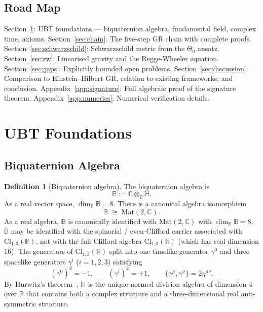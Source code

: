 \documentclass[12pt,a4paper]{article}
\theoremstyle{definition}
\newtheorem{definition}[theorem]{Definition}
\theoremstyle{remark}
\newcommand{\BB}{\mathbb{B}}
\newcommand{\CC}{\mathbb{C}}
\newcommand{\RR}{\mathbb{R}}
\newcommand{\HH}{\mathbb{H}}
\begin{document}
\subsection{Road Map}

Section~\ref{sec:foundations}: UBT foundations — biquaternion algebra,
fundamental field, complex time, axioms.
Section~\ref{sec:chain}: The five-step GR chain with complete proofs.
Section~\ref{sec:schwarzschild}: Schwarzschild metric from the $\Theta_0$ ansatz.
Section~\ref{sec:rw}: Linearised gravity and the Regge-Wheeler equation.
Section~\ref{sec:gaps}: Explicitly bounded open problems.
Section~\ref{sec:discussion}: Comparison to Einstein--Hilbert GR, relation
to existing frameworks, and conclusion.
Appendix~\ref{app:signature}: Full algebraic proof of the signature theorem.
Appendix~\ref{app:numerics}: Numerical verification details.

\section{UBT Foundations}
\label{sec:foundations}

\subsection{Biquaternion Algebra}

\begin{definition}[Biquaternion algebra]
\label{def:biquaternion}
The biquaternion algebra is
\[
  \BB := \CC\otimes_\RR\HH.
\]
As a real vector space, $\dim_\RR\BB = 8$.
There is a canonical algebra isomorphism
\[
  \BB \;\cong\; \mathrm{Mat}(2,\CC).
\]
As a real algebra, $\BB$ is canonically identified with $\mathrm{Mat}(2,\CC)$ with $\dim_\RR\BB=8$.
$\BB$ may be identified with the spinorial / even-Clifford carrier associated with $\mathrm{Cl}_{1,3}(\RR)$,
not with the full Clifford algebra $\mathrm{Cl}_{1,3}(\RR)$ (which has real dimension $16$).
The generators of $\mathrm{Cl}_{1,3}(\RR)$ split into one timelike generator
$\gamma^0$ and three spacelike generators $\gamma^i$ ($i = 1,2,3$) satisfying
\[
  (\gamma^0)^2 = -1, \qquad
  (\gamma^i)^2 = +1, \qquad
  \{\gamma^\mu, \gamma^\nu\} = 2\eta^{\mu\nu}.
\]
By Hurwitz's theorem~\cite{hurwitz1923}, $\HH$ is the unique normed division
algebra of dimension $4$ over $\RR$ that contains both a complex structure
and a three-dimensional real anti-symmetric structure.
\end{definition}
\end{document}
